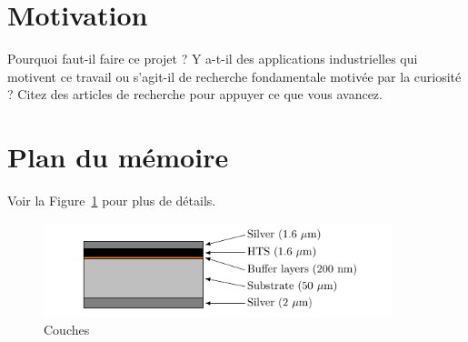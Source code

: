 \FloatBarrier


\section{Motivation}  %
Pourquoi faut-il faire ce projet ? Y a-t-il des applications industrielles qui motivent ce travail ou s'agit-il de recherche fondamentale motivée par la curiosité ?
Citez des articles de recherche pour appuyer ce que vous avancez.

\section{Plan du mémoire}  %

Voir la Figure~\ref{fig:Layers} pour plus de détails. 

\begin{figure}[htb]
\centering
\includegraphics[width=4in]{demo_tikz}
\caption{Couches}
\label{fig:Layers}
\end{figure}


